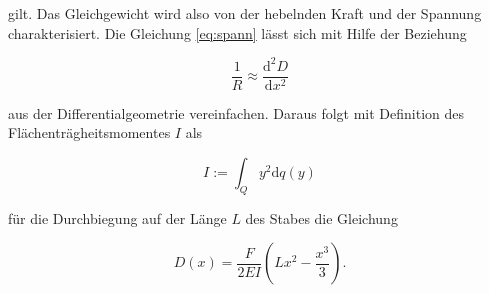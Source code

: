 \documentclass[
  bibliography=totoc,     %
  captions=tableheading,  %
  titlepage=firstiscover, %
]{scrartcl}
\begin{document}
gilt. Das Gleichgewicht wird also von der hebelnden Kraft und der Spannung
charakterisiert. Die Gleichung \eqref{eq:spann} lässt sich mit Hilfe der
Beziehung

\begin{equation}
	\frac{1}{R}\approx\frac{\mathup{d}^2D}{\mathup{d}x^2}
	\label{eq:approx}
\end{equation}

aus der Differentialgeometrie vereinfachen. Daraus folgt mit Definition des
Flächenträgheitsmomentes $I$ als

\begin{equation}
	I:=\int_Q y^2 \mathup{d}q(y)
	\label{eq:trägheit}
\end{equation}

für die Durchbiegung auf der Länge $L$ des Stabes die Gleichung

\begin{equation}
	D(x)=\frac{F}{2EI}\left(Lx^2-\frac{x^3}{3}\right)\text{.}
	\label{eq:durchbieg}
\end{equation}
\end{document}
